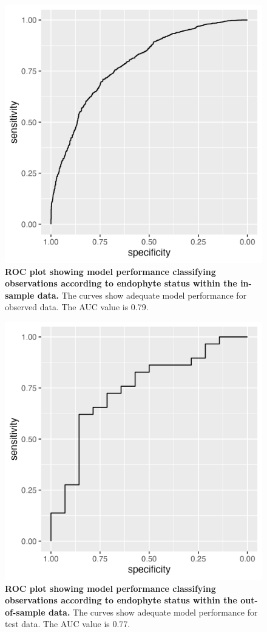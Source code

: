 \documentclass[11pt]{article}
\begin{document}
	
	\begin{figure}[H]
		\centering
		\includegraphics[width = .5\linewidth]{../Plots/ROC_training_plot.png}
		\caption{\textbf{ROC plot showing model performance classifying observations according to endophyte status within the in-sample data.} The curves show adequate model performance for observed data. The AUC value is 0.79.}
				\label{fig:ROCtraining}
	\end{figure}
	
		
	\begin{figure}[H]
		\centering
		\includegraphics[width = .5\linewidth]{../Plots/ROC_test_plot.png}
		\caption{\textbf{ROC plot showing model performance classifying observations according to endophyte status within the out-of-sample data.} The curves show adequate model performance for test data. The AUC value is 0.77.}
		\label{fig:ROCtest}
	\end{figure}
	
\end{document}
